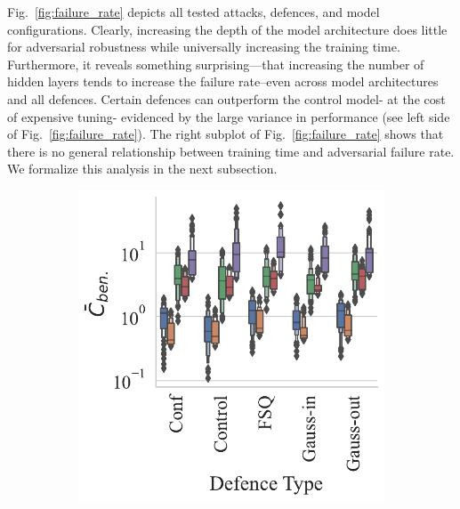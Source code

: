 Fig.~\ref{fig:failure_rate} depicts all tested attacks, defences, and model configurations. Clearly, increasing the depth of the model architecture does little for adversarial robustness while universally increasing the training time. Furthermore, it reveals something surprising---that increasing the number of hidden layers tends to increase the failure rate--even across model architectures and all defences. Certain defences can outperform the control model- at the cost of expensive tuning- evidenced by the large variance in performance (see left side of Fig.~\ref{fig:failure_rate}). The right subplot of Fig.~\ref{fig:failure_rate} shows that there is no general relationship between training time and adversarial failure rate. We formalize this analysis  in the next subsection.


\begin{figure}
    \centering
    \begin{subfigure}{.3\textwidth}
        \centering
        \includegraphics[width=\textwidth]{cifar/ben_failures_per_train_time_vs_defence_type.pdf}
    \end{subfigure}
    \begin{subfigure}{0.3\textwidth}

\end{subfigure}
\end{figure}
